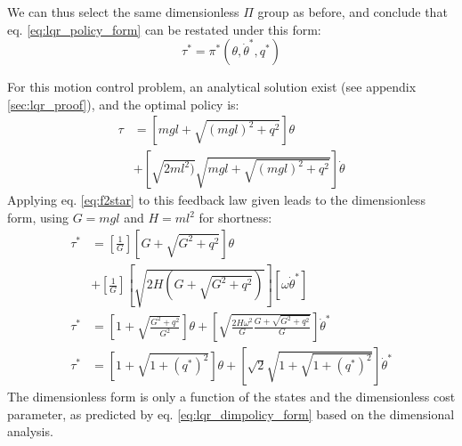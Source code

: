 We can thus select the same dimensionless $\Pi$ group as before, and conclude that eq. \eqref{eq:lqr_policy_form} can be restated under this form:
\begin{equation}
\tau^*
=
\pi^* \left(
 \theta, \dot{\theta}^* ,
 q^* 
\right)
\label{eq:lqr_dimpolicy_form}
\end{equation}

For this motion control problem, an analytical solution exist (see appendix \ref{sec:lqr_proof}), and the optimal policy is:
\begin{align}
\tau &= 
\left[
mgl +
\sqrt{ (mgl)^2 + q^2} \right] \theta
\nonumber \\ &+
\left[
\sqrt{ 2 ml^2)} \sqrt{mgl+ \sqrt{ (mgl)^2 + q^2}}
\right] \dot{\theta}
\label{eq:lqr_policy}
\end{align}
Applying eq. \eqref{eq:f2star} to this feedback law given leads to the dimensionless form, using $G=mgl$ and $H=ml^2$ for shortness:
\begin{align}
\tau^* &= \left[\frac{1}{G}\right] 
\left[ G + \sqrt{G^2+q^2}\right] \theta  \nonumber \\& + \left[\frac{1}{G}\right] \left[\sqrt{2H(G+\sqrt{G^2+q^2})}
\right] \left[\omega \dot{\theta}^*\right] \\
\tau^* &= 
\left[ 1 + \sqrt{\frac{G^2+q^2}{G^2}}\right] \theta + \left[\sqrt{\frac{2H\omega^2}{G}\frac{G+\sqrt{G^2+q^2}}{G}}
\right] \dot{\theta}^* \\
\tau^* &= 
\left[
1 + \sqrt{ 1 + (q^*)^2}
\right] \theta
+
\left[
\sqrt{2} \sqrt{ 1 + \sqrt{ 1 + (q^*)^2}}
\right] \dot{\theta}^*
\end{align}
The dimensionless form is only a function of the states and the dimensionless cost parameter, as predicted by eq. \eqref{eq:lqr_dimpolicy_form} based on the dimensional analysis.

